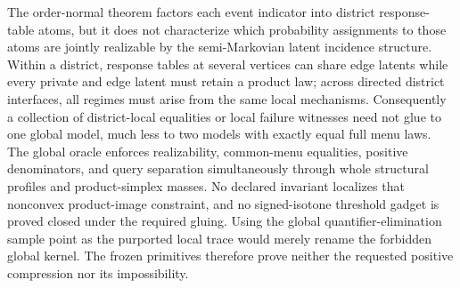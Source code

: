 The order-normal theorem factors each event indicator into district response-table atoms, but it does not characterize which probability assignments to those atoms are jointly realizable by the semi-Markovian latent incidence structure.  Within a district, response tables at several vertices can share edge latents while every private and edge latent must retain a product law; across directed district interfaces, all regimes must arise from the same local mechanisms.  Consequently a collection of district-local equalities or local failure witnesses need not glue to one global model, much less to two models with exactly equal full menu laws.  The global oracle enforces realizability, common-menu equalities, positive denominators, and query separation simultaneously through whole structural profiles and product-simplex masses.  No declared invariant localizes that nonconvex product-image constraint, and no signed-isotone threshold gadget is proved closed under the required gluing.  Using the global quantifier-elimination sample point as the purported local trace would merely rename the forbidden global kernel.  The frozen primitives therefore prove neither the requested positive compression nor its impossibility.